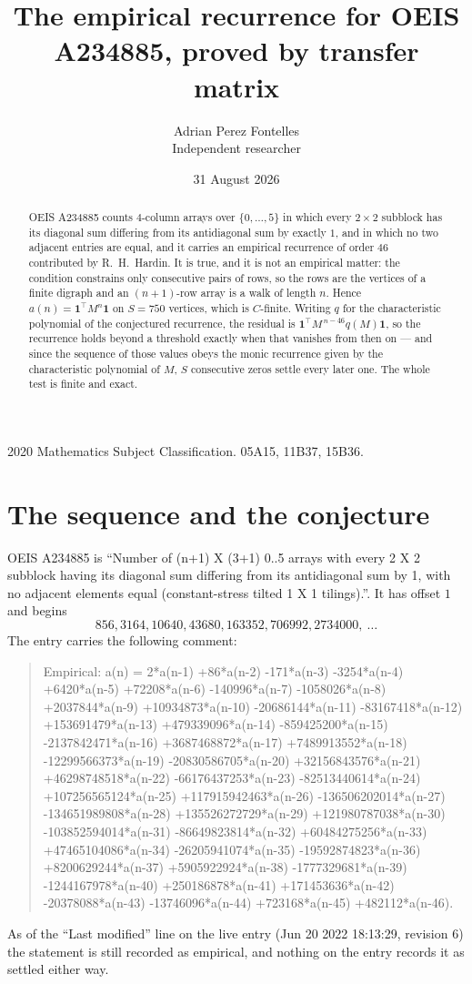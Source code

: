 \documentclass[11pt,a4paper]{article}
\title{The empirical recurrence for OEIS A234885, proved by transfer matrix}
\author{Adrian Perez Fontelles\\ \small Independent researcher}
\date{31 August 2026}
\theoremstyle{plain}
\theoremstyle{definition}
\begin{document}
\maketitle

\begin{abstract}
OEIS A234885 counts $4$-column arrays over $\{0,\dots,5\}$ in which every
$2\times2$ subblock has its diagonal sum differing from its antidiagonal sum by
exactly $1$, and in which no two adjacent entries are equal, and it
carries an empirical recurrence of order $46$ contributed by R.~H.~Hardin. It is true,
and it is not an empirical matter: the condition constrains only consecutive pairs of rows,
so the rows are the vertices of a finite digraph and an $(n+1)$-row array is a walk of
length $n$. Hence $a(n)=\mathbf{1}^{\!\top}M^{n}\mathbf{1}$ on $S=750$ vertices, which
is $C$-finite. Writing $q$ for the characteristic polynomial of the conjectured recurrence,
the residual is $\mathbf{1}^{\!\top}M^{\,n-46}q(M)\mathbf{1}$, so the recurrence
holds beyond a threshold exactly when that vanishes from then on --- and since the sequence
of those values obeys the monic recurrence given by the characteristic polynomial of $M$,
$S$ consecutive zeros settle every later one. The whole test is finite and exact.
\end{abstract}

\noindent\small 2020 Mathematics Subject Classification. 05A15, 11B37, 15B36.\normalsize

\section{The sequence and the conjecture}

OEIS A234885 is ``Number of (n+1) X (3+1) 0..5 arrays with every 2 X 2 subblock having its diagonal sum differing from its antidiagonal sum by 1, with no adjacent elements equal (constant-stress tilted 1 X 1 tilings).''. It has offset
$1$ and begins
\[
856, 3164, 10640, 43680, 163352, 706992, 2734000,\ \dots
\]
The entry carries the following comment:
\begin{quote}\small
Empirical: a(n) = 2*a(n-1) +86*a(n-2) -171*a(n-3) -3254*a(n-4) +6420*a(n-5) +72208*a(n-6) -140996*a(n-7) -1058026*a(n-8) +2037844*a(n-9) +10934873*a(n-10) -20686144*a(n-11) -83167418*a(n-12) +153691479*a(n-13) +479339096*a(n-14) -859425200*a(n-15) -2137842471*a(n-16) +3687468872*a(n-17) +7489913552*a(n-18) -12299566373*a(n-19) -20830586705*a(n-20) +32156843576*a(n-21) +46298748518*a(n-22) -66176437253*a(n-23) -82513440614*a(n-24) +107256565124*a(n-25) +117915942463*a(n-26) -136506202014*a(n-27) -134651989808*a(n-28) +135526272729*a(n-29) +121980787038*a(n-30) -103852594014*a(n-31) -86649823814*a(n-32) +60484275256*a(n-33) +47465104086*a(n-34) -26205941074*a(n-35) -19592874823*a(n-36) +8200629244*a(n-37) +5905922924*a(n-38) -1777329681*a(n-39) -1244167978*a(n-40) +250186878*a(n-41) +171453636*a(n-42) -20378088*a(n-43) -13746096*a(n-44) +723168*a(n-45) +482112*a(n-46).
\end{quote}
As of the ``Last modified'' line on the live entry (Jun 20 2022 18:13:29, revision 6) the statement is
still recorded as empirical, and nothing on the entry records it as settled either way.
\end{document}
